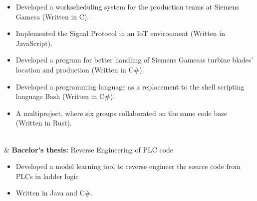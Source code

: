 \documentclass[a4paper]{report}
\begin{document}
\begin{longtabu}
\begin{itemize}[leftmargin=2em, topsep=-.5em, parsep=0em]
        \item Developed a workscheduling system for the production teams at Siemens Gamesa (Written in C).
        \item Implemented the Signal Protocol in an IoT environment (Written in JavaScript).
        \item Developed a program for better handling of Siemens Gamesas turbine blades' location and production (Written in C\#).
        \item Developed a programming language as a replacement to the shell scripting language Bash (Written in C\#).
        \item A multiproject, where six groups collaborated on the same code base (Written in Rust).
    \end{itemize}
    \vspace{-.1em}
    \\
        &  \textbf{Bacelor's thesis:} Reverse Engineering of PLC code
        \begin{itemize}[leftmargin=2em, topsep=-.5em, parsep=0em]
            \item Developed a model learning tool to reverse engineer the source code from PLCs in ladder logic
            \item Written in Java and C\#.
        \end{itemize}
\end{longtabu}
    \iffalse%
    \\\\
    2016--2017 & \textbf{Continuation School}\\lign=right, labelindent=!, leftmargin=6em, itemindent=!, labelsep=1em, labelwidth=!]
    &   Attendee at Ingstrup Efterskole in grade nine.
    \\\\
    2007--2016 & \textbf{Public School}\\
    &   Attendee at the public school in 9310 Vodskov (Vodskov Skole) from grade one to grade eight.
    \fi%
\end{document}
